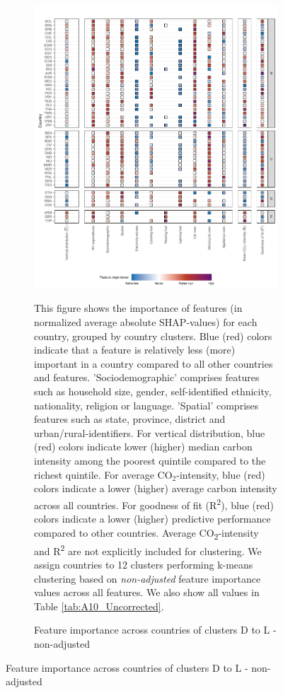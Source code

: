 \clearpage
\begin{figure}[ht!]\ContinuedFloat
    \centering
    \begin{subfigure}[b]{\textwidth}
    \centering
    \includegraphics{Figure 4/Figure_4_Uncorrected_2.pdf}
    \caption{Feature importance across countries of clusters D to L - non-adjusted}\label{fig:fig_4_2_uncorrected}
    \begin{subcaption2}
    This figure shows the importance of features (in normalized average absolute SHAP-values) for each country, grouped by country clusters. Blue (red) colors indicate that a feature is relatively less (more) important in a country compared to all other countries and features. 'Sociodemographic' comprises features such as household size, gender, self-identified ethnicity, nationality, religion or language. 'Spatial' comprises features such as state, province, district and urban/rural-identifiers. For vertical distribution, blue (red) colors indicate lower (higher) median carbon intensity among the poorest quintile compared to the richest quintile. For average CO$_{2}$-intensity, blue (red) colors indicate a lower (higher) average carbon intensity across all countries. For goodness of fit (R\textsuperscript{2}), blue (red) colors indicate a lower (higher) predictive performance compared to other countries. Average CO\textsubscript{2}-intensity and R\textsuperscript{2} are not explicitly included for clustering.
    We assign countries to 12 clusters performing k-means clustering based on \textit{non-adjusted} feature importance values across all features. We also show all values in Table \ref{tab:A10_Uncorrected}.
    \end{subcaption2}
    \end{subfigure}
    
\end{figure}
\clearpage

